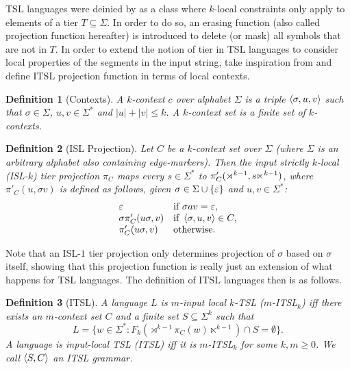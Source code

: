 \documentclass[11pt,a4paper]{article}
\newtheorem{definition}{Definition}
\begin{document}
TSL languages were deinied by \citet{} as a class where $k$-local constraints only apply to elements of a tier $T \subseteq \Sigma$.
In order to do so, an erasing function (also called projection function hereafter) is introduced to delete (or mask) all symbols that are not in $T$.
In order to extend the notion of tier in TSL languages to consider local properties of the segments in the input string, \citet{desanto2019structure} take inspiration from \cite{ChandleeHeinz18} and define ITSL projection function in terms of local contexts.
%
\begin{definition}[Contexts]
    A \emph{$k$-context} $c$ over alphabet $\Sigma$ is a triple $\left \langle \sigma, u, v \right \rangle $ such that $\sigma \in \Sigma$, $u, v \in \Sigma^*$ and $|u| + |v| \leq k$.
    A \emph{$k$-context set} is a finite set of $k$-contexts.
\end{definition}
%
\begin{definition}[ISL Projection]
    Let $C$ be a $k$-context set over $\Sigma$ (where $\Sigma$ is an arbitrary alphabet also containing edge-markers).
    Then the \emph{input strictly $k$-local} (ISL-$k$) tier projection $\pi_C$ maps every $s \in \Sigma^*$ to $\pi'_C(\rtimes^{k-1}, s\ltimes^{k-1})$, where $\pi'_C(u, \sigma v)$ is defined as follows, given $\sigma \in \Sigma \cup \left \{ \varepsilon \right \}$ and $u,v \in \Sigma^*$:
    \[
    \begin{array}{ll}
        \varepsilon & \text{if } \sigma a v = \varepsilon,\\
        \sigma \pi'_C(u\sigma, v) & \text{if } \left \langle \sigma, u, v \right \rangle  \in C,\\
        \pi'_C(u\sigma, v) & \text{otherwise.}
    \end{array}
    \]
\end{definition}
Note that an ISL-$1$ tier projection only determines projection of $\sigma$ based on $\sigma$ itself, showing that this projection function is really just an extension of what happens for TSL languages\@.
The definition of ITSL languages then  is as follows\@.

\begin{definition}[ITSL]
A language $L$ is \emph{$m$-input local $k$-TSL} ($m$-ITSL$_k$) iff there exists an $m$-context set $C$ and a finite set $S \subseteq \Sigma^k$ such that
\[
L = \{ w \in \Sigma^*: F_k (\rtimes^{k-1} \pi_C(w) \ltimes^{k-1})  \cap S = \emptyset \}.
\]
A language is \emph{input-local TSL} (ITSL) iff it is $m$-ITSL$_k$ for some $k, m \geq 0$.
We call $\left \langle S, C \right \rangle $ an ITSL grammar.
\label{dfn:ITSL}
\end{definition}
\end{document}
